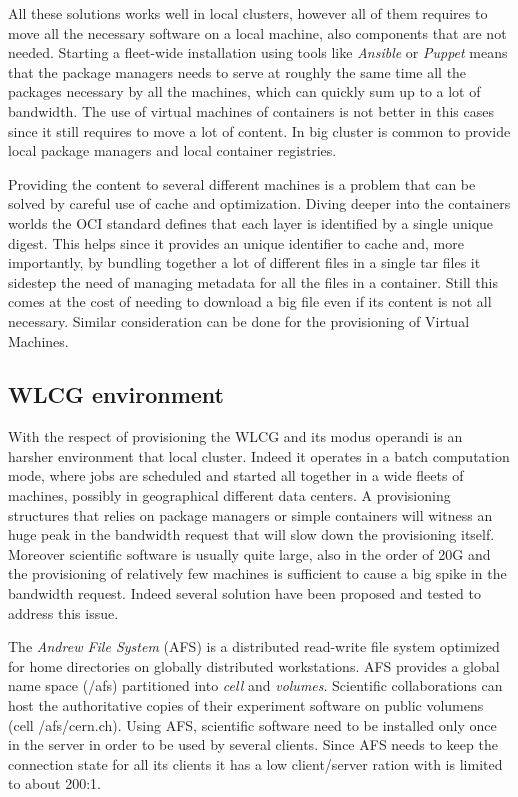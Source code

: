 All these solutions works well in local clusters, however all of them requires
to move all the necessary software on a local machine, also components that are
not needed. Starting a fleet-wide installation using tools like
\textit{Ansible} or \textit{Puppet} means that the package managers needs to
serve at roughly the same time all the packages necessary by all the machines,
which can quickly sum up to a lot of bandwidth. The use of virtual machines of
containers is not better in this cases since it still requires to move a lot of
content. In big cluster is common to provide local package managers and local
container registries.

Providing the content to several different machines is a problem that can be
solved by careful use of cache and optimization. Diving deeper into the
containers worlds the OCI standard defines that each layer is identified by a
single unique digest. This helps since it provides an unique identifier to
cache and, more importantly, by bundling together a lot of different files in a
single tar files it sidestep the need of managing metadata for all the files in
a container. Still this comes at the cost of needing to download a big file
even if its content is not all necessary. Similar consideration can be done for
the provisioning of Virtual Machines.

\subsection{WLCG environment} \label{subsec:soawlcg}

With the respect of provisioning the WLCG and its modus operandi is an harsher
environment that local cluster. Indeed it operates in a batch computation mode,
where jobs are scheduled and started all together in a wide fleets of machines,
possibly in geographical different data centers. A provisioning structures that
relies on package managers or simple containers will witness an huge peak in
the bandwidth request that will slow down the provisioning itself.  Moreover
scientific software is usually quite large, also in the order of 20G and the
provisioning of relatively few machines is sufficient to cause a big spike in
the bandwidth request. Indeed several solution have been proposed and tested to
address this issue.

The \textit{Andrew File System} \cite{andrew} (AFS) is a distributed read-write
file system optimized for home directories on globally distributed
workstations. AFS provides a global name space (/afs) partitioned into
\textit{cell} and \textit{volumes}. Scientific collaborations can host the
authoritative copies of their experiment software on public volumens (cell
/afs/cern.ch). Using AFS, scientific software need to be installed only once in
the server in order to be used by several clients.  Since AFS needs to keep the
connection state for all its clients it has a low client/server ration with is
limited to about 200:1.

